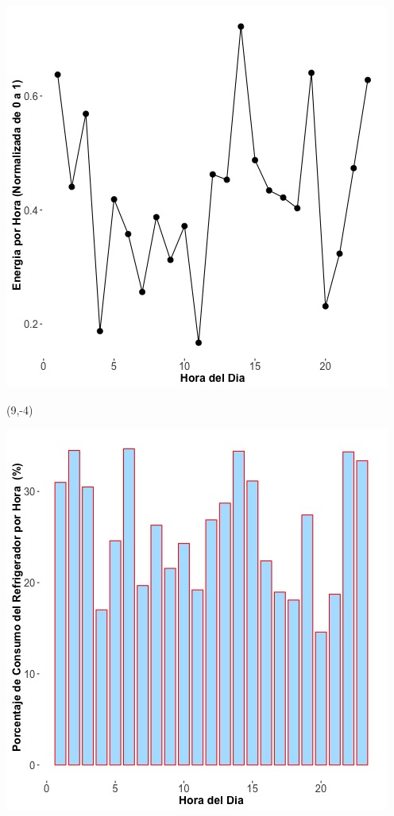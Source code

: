 \documentclass{article}\usepackage[]{graphicx}\usepackage[]{color}
\newenvironment{knitrout}{}{} %
\begin{document}
\begin{knitrout}
\color{fgcolor}
\includegraphics[scale=0.75]{figure/A22_fplot_norm_median} 
\end{knitrout}


 \begin{textblock}{1}(9,-4)
\begin{minipage}{20em}
\begingroup

\endgroup
\end{minipage}
\end{textblock}

 \vspace{2cm}

\begin{knitrout}
\color{fgcolor}
\includegraphics[scale=0.65]{figure/A22_fridge_energy_pct.jpg} 
\end{knitrout}
\end{document}
